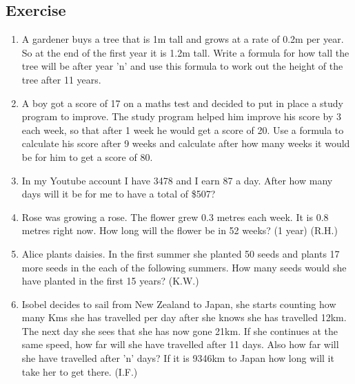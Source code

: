 \subsection{Exercise}
\begin{enumerate}
	\item A gardener buys a tree that is 1m tall and grows at a rate of 0.2m per year.  So at the end of the first year it is 1.2m tall.  Write a formula for how tall the tree will be after year 'n' and use this formula to work out the height of the tree after 11 years.
	\item A boy got a score of 17 on a maths test and decided to put in place a study program to improve.  The study program helped him improve his score by 3 each week, so that after 1 week he would get a score of 20.  Use a formula to calculate his score after 9 weeks and calculate after how many weeks it would be for him to get a score of 80.
	\item In my Youtube account I have 3478\cent \hspace{0.2cm} and I earn 87\cent \hspace{0.2cm} a day.  After how many days will it be for me to have a total of \$507?
	\item Rose was growing a rose. The flower grew 0.3 metres each week. It is 0.8 metres right now. How long will the flower be in 52 weeks? (1 year) (R.H.)
	\item Alice plants daisies.  In the first summer she planted 50 seeds and plants 17 more seeds in the each of the following summers.  How many seeds would she have planted in the first 15 years? (K.W.)
	\item Isobel decides to sail from New Zealand to Japan, she starts counting how many Kms she has travelled per day after she knows she has travelled 12km.  The next day she sees that she has now gone 21km.  If she continues at the same speed, how far will she have travelled after 11 days.  Also how far will she have travelled after 'n' days?  If it is 9346km to Japan how long will it take her to get there. (I.F.)
\end{enumerate}